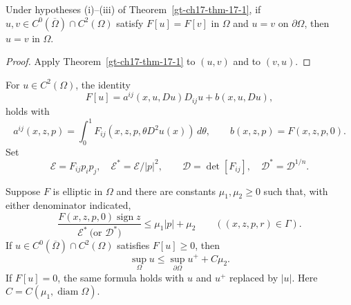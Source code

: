\begin{corollary}\label{gt-ch17-cor-17-2}
Under hypotheses (i)--(iii) of Theorem~\ref{gt-ch17-thm-17-1}, if
$u,v\in C^0(\overline\Omega)\cap C^2(\Omega)$ satisfy $F[u]=F[v]$ in
$\Omega$ and $u=v$ on $\partial\Omega$, then $u=v$ in $\Omega$.
\end{corollary}
\begin{proof}
\sketch Apply Theorem~\ref{gt-ch17-thm-17-1} to $(u,v)$ and to $(v,u)$.
\end{proof}

For $u\in C^2(\Omega)$, the identity
\begin{equation}\tag{17.10}
F[u]=a^{ij}(x,u,Du)D_{ij}u+b(x,u,Du),
\end{equation}
holds with
\[
a^{ij}(x,z,p)=\int_0^1F_{ij}(x,z,p,\theta D^2u(x))\,d\theta,
\qquad b(x,z,p)=F(x,z,p,0).
\]
Set
\[
\mathcal E=F_{ij}p_ip_j,\quad \mathcal E^*=\mathcal E/|p|^2,
\qquad \mathcal D=\det[F_{ij}],\quad \mathcal D^*=\mathcal D^{1/n}.
\]

\begin{theorem}\label{gt-ch17-thm-17-3}
Suppose $F$ is elliptic in $\Omega$ and there are constants
$\mu_1,\mu_2\ge0$ such that, with either denominator indicated,
\begin{equation}\tag{17.11}
\frac{F(x,z,p,0)\operatorname{sign}z}{\mathcal E^*\ \text{(or }\mathcal D^*\text{)}}
\le\mu_1|p|+\mu_2
\qquad ((x,z,p,r)\in\Gamma).
\end{equation}
If $u\in C^0(\overline\Omega)\cap C^2(\Omega)$ satisfies $F[u]\ge0$, then
\begin{equation}\tag{17.12}
\sup_\Omega u\le\sup_{\partial\Omega}u^++C\mu_2.
\end{equation}
If $F[u]=0$, the same formula holds with $u$ and $u^+$ replaced by $|u|$.
Here $C=C(\mu_1,\operatorname{diam}\Omega)$.
\end{theorem}

